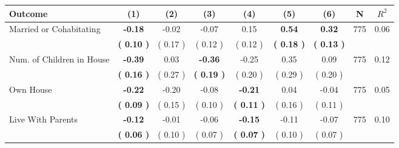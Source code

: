 \begin{tabular}{lcccccccc}
\toprule
 \textbf{Outcome} & \textbf{(1)} & \textbf{(2)} & \textbf{(3)} & \textbf{(4)} & \textbf{(5)} & \textbf{(6)} & \textbf{N} & \textbf{$ R^2$} \\
\midrule
Married or Cohabitating & \textbf{    -0.18} &     -0.02 &     -0.07 &      0.15 & \textbf{     0.54} & \textbf{     0.32} & 775 &       0.06 \\ 
 & \textbf{(     0.10 )} & (     0.17 ) & (     0.12 ) & (     0.12 ) & \textbf{(     0.18 )} & \textbf{(     0.13 )} & \\
Num. of Children in House & \textbf{    -0.39} &      0.03 & \textbf{    -0.36} &     -0.25 &      0.35 &      0.09 & 775 &       0.12 \\ 
 & \textbf{(     0.16 )} & (     0.27 ) & \textbf{(     0.19 )} & (     0.20 ) & (     0.29 ) & (     0.20 ) & \\
Own House & \textbf{    -0.22} &     -0.20 &     -0.08 & \textbf{    -0.21} &      0.04 &     -0.04 & 775 &       0.05 \\ 
 & \textbf{(     0.09 )} & (     0.15 ) & (     0.10 ) & \textbf{(     0.11 )} & (     0.16 ) & (     0.11 ) & \\
Live With Parents & \textbf{    -0.12} &     -0.01 &     -0.06 & \textbf{    -0.15} &     -0.11 &     -0.07 & 775 &       0.10 \\ 
 & \textbf{(     0.06 )} & (     0.10 ) & (     0.07 ) & \textbf{(     0.07 )} & (     0.10 ) & (     0.07 ) & \\
\bottomrule
\end{tabular}
